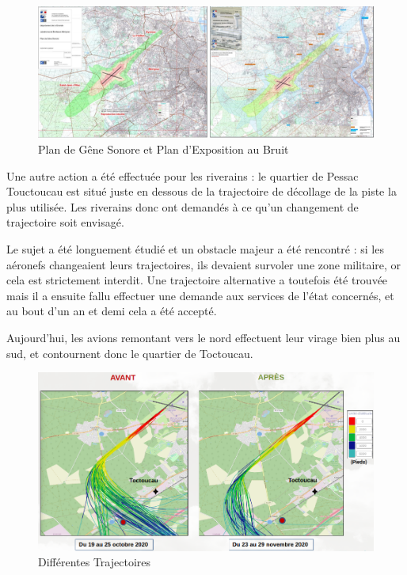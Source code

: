 \begin{figure}[hbt!]
  \centering
  \includegraphics[width=16cm]{Images/pgs_peb.png}\newline
  \caption{Plan de Gêne Sonore et Plan d'Exposition au Bruit}
  \label{fig:pgs_peb}
\end{figure}


Une autre action a été effectuée pour les riverains : le quartier de Pessac Touctoucau est situé juste en dessous de la trajectoire de décollage de la piste la plus utilisée. Les riverains donc ont demandés à ce qu'un changement de trajectoire soit envisagé.

Le sujet a été longuement étudié et un obstacle majeur a été rencontré : si les aéronefs changeaient leurs trajectoires, ils devaient survoler une zone militaire, or cela est strictement interdit.
Une trajectoire alternative a toutefois été trouvée mais il a ensuite fallu effectuer une demande aux services de l'état concernés, et au bout d'un an et demi cela a été accepté.\newline

Aujourd'hui, les avions remontant vers le nord effectuent leur virage bien plus au sud, et contournent donc le quartier de Toctoucau.\newline

\begin{figure}[hbt!]
  \centering
  \includegraphics[width=13.5cm]{Images/trajectoires_avant_apres.png}\newline
  \caption{Différentes Trajectoires}
  \label{fig:trajectoires}
\end{figure}

